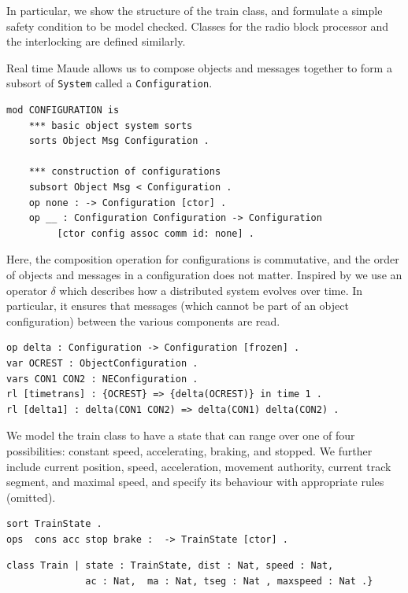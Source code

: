 \documentclass[runningheads,a4paper]{llncs}
\begin{document}
In particular, we show the structure of the train class, and formulate
a simple safety condition to be model checked.  Classes for the radio
block processor and the interlocking are defined similarly.

Real time Maude allows us to compose objects and messages 
together to form a subsort of \texttt{System} called a \texttt{Configuration}.

\begin{verbatim}
mod CONFIGURATION is  
    *** basic object system sorts  
    sorts Object Msg Configuration .  
 
    *** construction of configurations  
    subsort Object Msg < Configuration .  
    op none : -> Configuration [ctor] .  
    op __ : Configuration Configuration -> Configuration  
         [ctor config assoc comm id: none] .
\end{verbatim}

Here, the composition operation for configurations is commutative, and
the order of objects and messages in a configuration does not
matter. Inspired by \cite{delta} we use an operator $\delta$ which describes
how a distributed system evolves over time. In particular, it ensures
that messages (which cannot be part of an object configuration)
between the various components are read. 

\begin{verbatim}
op delta : Configuration -> Configuration [frozen] . 
var OCREST : ObjectConfiguration .
vars CON1 CON2 : NEConfiguration .
rl [timetrans] : {OCREST} => {delta(OCREST)} in time 1 .
rl [delta1] : delta(CON1 CON2) => delta(CON1) delta(CON2) .
\end{verbatim}

We model the train class to have a state that can range over one of four
possibilities: constant speed, accelerating, braking, and
stopped. We further include current position,
speed, acceleration, movement authority, current track segment, and
maximal speed, and specify its behaviour with appropriate rules
(omitted).

\begin{verbatim}
sort TrainState .
ops  cons acc stop brake :  -> TrainState [ctor] .
\end{verbatim}

\begin{verbatim}
class Train | state : TrainState, dist : Nat, speed : Nat, 
              ac : Nat,  ma : Nat, tseg : Nat , maxspeed : Nat .}
\end{verbatim}
\end{document}

